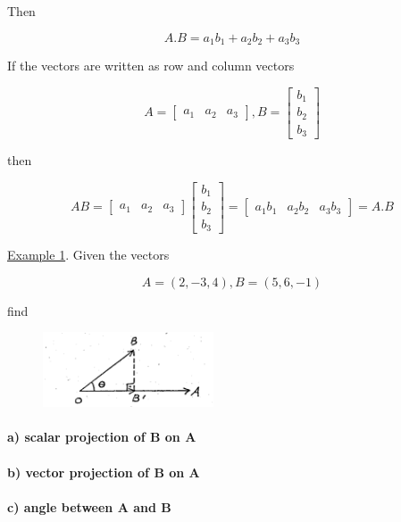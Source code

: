 \documentclass[11pt]{amsbook}
\begin{document}
\par Then


\[
A.B=a_1b_1+a_2b_2+a_3b_3
\]

If the vectors are written as row and column vectors

\[
A=	 \begin{bmatrix}
       a_1 & a_2 & a_3           
     \end{bmatrix},   
B=	 \begin{bmatrix}
       b_1 \\
       b_2 \\
       b_3           
     \end{bmatrix}       
\]

then

\[
AB= \begin{bmatrix}
       a_1 & a_2 & a_3           
     \end{bmatrix}   
	 \begin{bmatrix}
       b_1 \\
       b_2 \\
       b_3           
     \end{bmatrix}
     =\begin{bmatrix}
     a_1b_1 & a_2b_2 & a_3b_3
     \end{bmatrix}
     =A.B
\]     

\par \underline{Example 1}. Given the vectors

\[
	A = (2, -3, 4), B = (5, 6, -1)
\]

find
\begin{figure}
\includegraphics[width=0.45\textwidth]{images/b2p1-129-fig01}
\end{figure}
\paragraph{ a) scalar projection of B on A }
\paragraph{ b) vector projection of B on A }
\paragraph{ c) angle between A and B \\}
\end{document}
